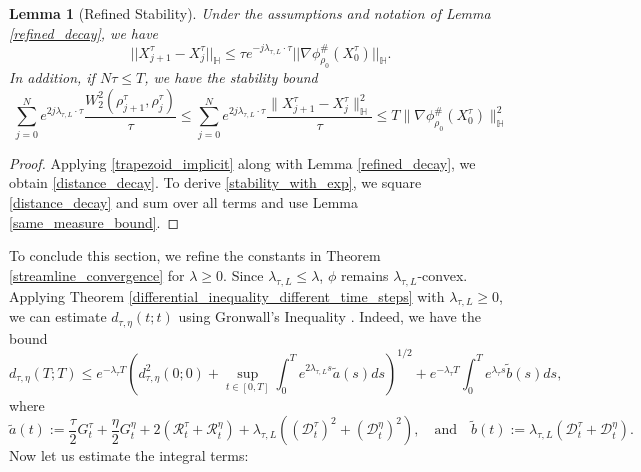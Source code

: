 \documentclass[11pt,a4paper]{amsart}
\newcommand{\1}{\mathds{1}}
\newtheorem{lemma}[theorem]{\textbf{Lemma}}
\numberwithin{equation}{section}
\begin{document}
\begin{lemma}[Refined Stability]  \label{refined_stability} Under the assumptions and notation of Lemma \ref{refined_decay},  we have
\begin{equation}  ||X^{\tau}_{j+1}-X^{\tau}_j||_{\mathbb{H}} \leq  \tau e^{-j  \lambda_{\tau,L} \cdot \tau} ||\nabla \phi^{\#}_{\rho_0}(X_0^{\tau})||_{\mathbb{H}} \label{distance_decay}.
\end{equation} In addition, if $N \tau \leq T$, we have the stability bound
\begin{equation}
\sum_{j=0}^{N} e^{2j \lambda_{\tau,L} \cdot \tau} \frac{W_2^2(\rho^{\tau}_{j+1},\rho^{\tau}_j)}{\tau} \leq \sum_{j=0}^{N} e^{2j \lambda_{\tau,L} \cdot \tau} \frac{\|X^{\tau}_{j+1} - X^{\tau}_j\|^2_{\mathbb{H}}}{\tau} \leq  T \|\nabla \phi^{\#}_{\rho_0}(X^{\tau}_0)\|^2_{\mathbb{H}}   \label{stability_with_exp} \end{equation} 
\end{lemma}

\begin{proof} 
Applying \eqref{trapezoid_implicit} along with Lemma \ref{refined_decay}, we obtain \eqref{distance_decay}. To derive \eqref{stability_with_exp}, we square \eqref{distance_decay} and sum over all terms and use Lemma \ref{same_measure_bound}. \end{proof}

To conclude this section, we refine the constants in Theorem \ref{streamline_convergence} for $ \lambda \geq 0 $. Since $ \lambda_{\tau,L} \leq \lambda $, $\phi$ remains $ \lambda_{\tau,L} $-convex. Applying Theorem \ref{differential_inequality_different_time_steps} with $ \lambda_{\tau,L} \geq 0 $, we can estimate $ d_{\tau,\eta}(t;t) $ using Gronwall’s Inequality \cite[Lemma 4.1.8]{ambrosio2005gradient}. Indeed, we have the bound
\begin{equation} \label{positive_d_interpolated_bound} d_{\tau,\eta}(T;T) \leq e^{-\lambda_{\tau} T} \left( d^2_{\tau,\eta}(0;0) + \sup_{t \in [0,T]} \int_0^T e^{2 \lambda_{\tau,L} s} \tilde{a}(s) ds \right)^{1/2} + e^{-\lambda_{\tau} T} \int_0^T e^{\lambda_{\tau} s} \tilde{b}(s) ds, \end{equation} where
\[
\tilde{a}(t) := \frac{\tau}{2} G^{\tau}_t + \frac{\eta}{2} G^{\eta}_t + 2(\mathcal{R}_t^{\tau} + \mathcal{R}_t^{\eta}) + \lambda_{\tau,L}( (\mathcal{D}_t^{\tau})^2 + (\mathcal{D}_t^{\eta})^2), \quad \text{and} \quad \tilde{b}(t):= \lambda_{\tau,L}(\mathcal{D}_t^{\tau}+\mathcal{D}_t^{\eta}).
\]
Now let us estimate the integral terms:
\end{document}
